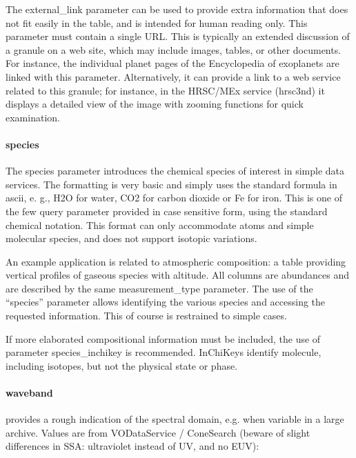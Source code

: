 \documentclass[11pt,a4paper]{ivoa}
\begin{document}
The external\_link parameter can be used to provide extra information that does not fit easily in the table, and is intended for human reading only. This parameter must contain a single URL. This is typically an extended discussion of a granule on a web site, which may include images, tables, or other documents. For instance, the individual planet pages of the Encyclopedia of exoplanets are linked with this parameter. Alternatively, it can provide a link to a web service related to this granule; for instance, in the HRSC/MEx service (hrsc3nd) it displays a detailed view of the image with zooming functions for quick examination.\\

\paragraph{species}

The species parameter introduces the chemical species of interest in simple data services. The formatting is very basic and simply uses the standard formula in ascii, e. g., H2O for water, CO2 for carbon dioxide or Fe for iron. This is one of the few query parameter provided in case sensitive form, using the standard chemical notation. This format can only accommodate atoms and simple molecular species, and does not support isotopic variations.  

An example application is related to atmospheric composition: a table providing vertical profiles of gaseous species with altitude. All columns are abundances and are described by the same measurement\_type parameter. The use of the ``species'' parameter allows identifying the various species and accessing the requested information. This of course is restrained to simple cases.

If more elaborated compositional information must be included, the use of parameter species\_inchikey is recommended. InChiKeys identify molecule, including isotopes, but not the physical state or phase.\\

\paragraph{waveband}

provides a rough indication of the spectral domain, e.g. when variable in a large archive. Values are from VODataService / ConeSearch (beware of slight differences in SSA: ultraviolet instead of UV, and no EUV): 
\end{document}
